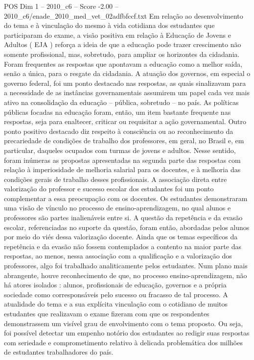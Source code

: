 \begin{textsample}{POS Dim 1 – 2010\_c6 – Score -2.00 – 2010\_c6/enade\_2010\_med\_vet\_02adfbfccf.txt}
Em relação ao desenvolvimento do tema e à vinculação do mesmo à vida cotidiana dos estudantes que participaram do exame, a visão positiva em relação à Educação de Jovens e Adultos ( EJA ) reforça a ideia de que a educação pode trazer crescimento não somente profissional, mas, sobretudo, para ampliar os horizontes da cidadania.
Foram frequentes as respostas que apontavam a educação como a melhor saída, senão a única, para o resgate da cidadania.
A atuação dos governos, em especial o governo federal, foi um ponto destacado nas respostas, as quais sinalizavam para a necessidade de as instâncias governamentais assumirem um papel cada vez mais ativo na consolidação da educação – pública, sobretudo – no país.
As políticas públicas focadas na educação foram, então, um item bastante frequente nas respostas, seja para enaltecer, criticar ou requisitar a ação governamental.
Outro ponto positivo destacado diz respeito à consciência ou ao reconhecimento da precariedade de condições de trabalho dos professores, em geral, no Brasil e, em particular, daqueles ocupados com turmas de jovens e adultos.
Nesse sentido, foram inúmeras as propostas apresentadas na segunda parte das respostas com relação à imperiosidade de melhoria salarial para os docentes, e à melhoria das condições gerais de trabalho desses profissionais.
A associação direta entre valorização do professor e sucesso escolar dos estudantes foi um ponto complementar a essa preocupação com os docentes.
Os estudantes demonstraram uma visão de vínculo no processo de ensino-aprendizagem, no qual alunos e professores são partes inalienáveis entre si.
A questão da repetência e da evasão escolar, referenciadas no suporte da questão, foram então, abordadas pelos alunos por meio do viés dessa valorização docente.
Ainda que os temas específicos da repetência e da evasão não fossem contemplados a contento na maior parte das respostas, ao menos, nessa associação com a qualificação e a valorização dos professores, algo foi trabalhado analiticamente pelos estudantes.
Num plano mais abrangente, houve reconhecimento de que, no processo ensino-aprendizagem, não há atores isolados : alunos, profissionais de educação, governos e a própria sociedade como corresponsáveis pelo sucesso ou fracasso de tal processo.
A atualidade do tema e a sua explícita vinculação com o cotidiano de muitos estudantes que realizavam o exame fizeram com que os respondentes demonstrassem um visível grau de envolvimento com o tema proposto.
Ou seja, foi possível detectar um empenho notório dos estudantes ao redigir suas respostas com seriedade e comprometimento relativo à delicada problemática dos milhões de estudantes trabalhadores do país.

\end{textsample}
